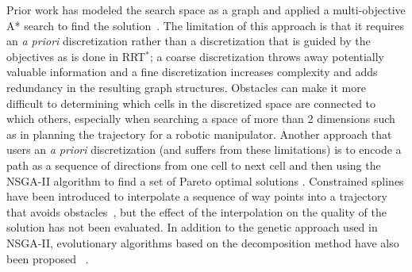 \documentclass{article}
\begin{document}
Prior work has modeled the search space as a graph and applied a multi-objective A* search to find the solution~\cite{Mandow:2005:NAM:1642293.1642328}. 
The limitation of this approach is that it requires an {\em a priori} discretization rather than a discretization that is guided by the objectives as is done in RRT$^{*}$; a coarse discretization throws away potentially valuable information and a fine discretization increases complexity and adds redundancy in the resulting graph structures.
Obstacles can make it more difficult to determining which cells in the discretized space are connected to which others, especially when searching a space of more than 2 dimensions such as in planning the trajectory for a robotic manipulator.
Another approach that users an {\em a priori} discretization (and suffers from these limitations) is to encode a path as a sequence of directions from one cell to next cell and then using the NSGA-II algorithm to find a set of Pareto optimal solutions \cite{Ahmed2013}.  
Constrained splines have been introduced to interpolate a sequence of way points into a trajectory that avoids obstacles~\cite{6181426}, but the effect of the interpolation on the quality of the solution has not been evaluated.
In addition to the genetic approach used in NSGA-II, evolutionary algorithms based on the decomposition method have also been proposed ~\cite{6600851}.

\end{document}
